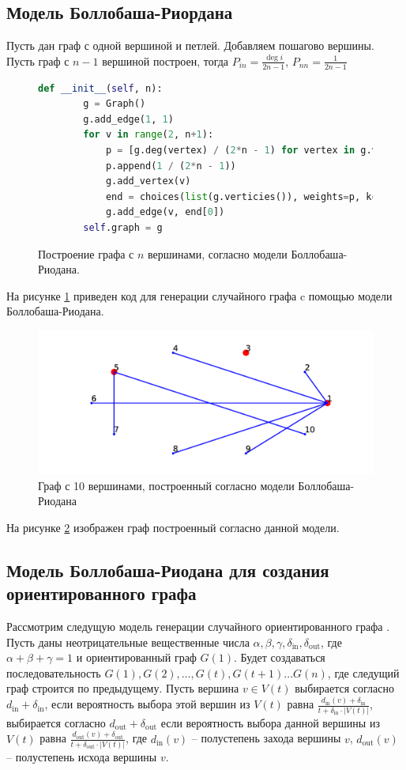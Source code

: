 \subsection{Модель Боллобаша-Риордана}
Пусть дан граф с одной вершиной и петлей. 
Добавляем пошагово вершины. Пусть граф с $n-1$ 
вершиной построен, тогда 
$P_{in} = \frac{\deg{i}}{2n - 1}$, $P_{nn} = \frac{1}{2n - 1}$
\begin{figure}[H] 
\begin{lstlisting}[language=Python] 
    def __init__(self, n):
        g = Graph()
        g.add_edge(1, 1)
        for v in range(2, n+1):
            p = [g.deg(vertex) / (2*n - 1) for vertex in g.verticies()]
            p.append(1 / (2*n - 1))
            g.add_vertex(v)
            end = choices(list(g.verticies()), weights=p, k=1)
            g.add_edge(v, end[0])
        self.graph = g
\end{lstlisting}  
    \caption{Построение графа с $n$ вершинами, согласно модели 
    Боллобаша-Риодана.}
    \label{br_1}
\end{figure} 
На рисунке \ref{br_1} приведен код для генерации случайного графа
c помощью модели Боллобаша-Риодана.
\begin{figure}[H] 
    \includegraphics{br.pdf} 
    \caption{Граф с 10 вершинами, построенный согласно модели
    Боллобаша-Риодана}
    \label{br_2}
\end{figure} 
На рисунке \ref{br_2} изображен граф построенный согласно данной модели.
\subsection{Модель Боллобаша-Риодана для создания ориентированного графа}
Рассмотрим следущую модель генерации случайного ориентированного графа \cite{bolor}. Пусть даны неотрицательные вещественные числа 
$\alpha,\beta,\gamma,\delta_{\text{in}},\delta_{\text{out}}$, где
$\alpha + \beta + \gamma = 1$ и ориентированный граф  $G(1)$.
Будет создаваться последовательность $G(1),G(2),\dots, G(t),G(t+1) \dots G(n)$, где следущий граф строится по предыдущему.
Пусть вершина  $v \in V(t)$ выбирается согласно $d_{\text{in}} + \delta_{\text{in}}$, если 
вероятность выбора этой вершин из $V(t)$ равна  $\frac{d_{\text{in}}(v) +\delta_{\text{in}}}{t + \delta_{\text{in}} \cdot |V(t)|}$,
выбирается согласно $d_{\text{out}} + \delta_{\text{out}}$ 
если вероятность выбора данной вершины из $V(t)$ равна 
$\frac{d_{\text{out}}(v) +\delta_{\text{out}}}{t + \delta_{\text{out}} \cdot |V(t)|}$, где $d_{\text{in}}(v)$ -- полустепень захода вершины $v$, $d_{\text{out}}(v)$ -- полустепень исхода вершины $v$.

